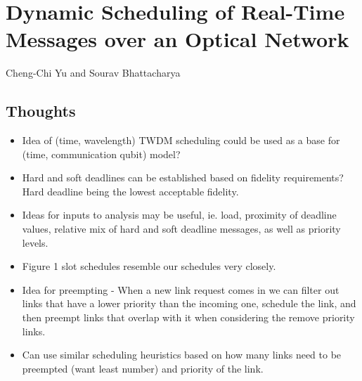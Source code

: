 \documentclass{article}
\begin{document}
\section{Dynamic Scheduling of Real-Time Messages over an Optical Network}
Cheng-Chi Yu and Sourav Bhattacharya

\subsection{Thoughts}
\begin{itemize}
    \item Idea of (time, wavelength) TWDM scheduling could be used as a base for (time, communication qubit) model?
    \item Hard and soft deadlines can be established based on fidelity requirements?  Hard deadline being the lowest acceptable fidelity.
    \item Ideas for inputs to analysis may be useful, ie. load, proximity of deadline values, relative mix of hard and soft deadline messages, as well as priority levels.
    \item Figure 1 slot schedules resemble our schedules very closely.
    \item Idea for preempting - When a new link request comes in we can filter out links that have a lower priority than the incoming one, schedule the link, and then preempt links that overlap with it when considering the remove priority links.
    \item Can use similar scheduling heuristics based on how many links need to be preempted (want least number) and priority of the link.
\end{itemize}
\end{document}
